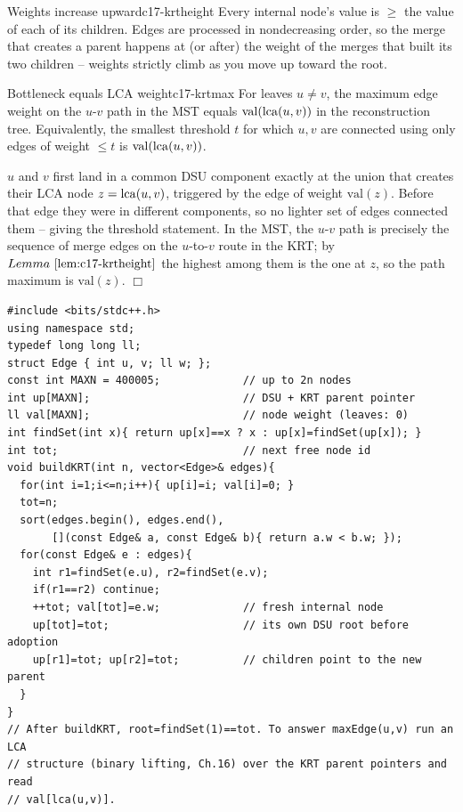 \begin{lemma}{Weights increase upward}{c17-krtheight}
Every internal node's value is \(\ge\) the value of each of its children.  Edges
are processed in nondecreasing order, so the merge that creates a parent happens
at (or after) the weight of the merges that built its two children -- weights
strictly climb as you move up toward the root.
\end{lemma}

\begin{theorem}{Bottleneck equals LCA weight}{c17-krtmax}
For leaves \(u\ne v\), the maximum edge weight on the \(u\)-\(v\) path in the MST
equals \(\mathrm{val}(\operatorname{lca}(u,v))\) in the reconstruction tree.  Equivalently, the
smallest threshold \(t\) for which \(u,v\) are connected using only edges of
weight \(\le t\) is \(\mathrm{val}(\operatorname{lca}(u,v))\).
\end{theorem}

\begin{proofbox}
\(u\) and \(v\) first land in a common DSU component exactly at the union that
creates their LCA node \(z=\operatorname{lca}(u,v)\), triggered by the edge of weight
\(\mathrm{val}(z)\).  Before that edge they were in different components, so no
lighter set of edges connected them -- giving the threshold statement.  In the
MST, the \(u\)-\(v\) path is precisely the sequence of merge edges on the
\(u\)-to-\(v\) route in the KRT; by \(\lemref{c17-krtheight}\) the highest among
them is the one at \(z\), so the path maximum is \(\mathrm{val}(z)\). \(\Box\)
\end{proofbox}

\begin{lstlisting}[caption={Kruskal-reconstruction tree. On every successful union, allocate a new node weighted by the edge and adopt the two component representatives as its children. The up array doubles as the DSU and the KRT parent pointer (find walks it). Queries then reduce to LCA on the KRT (Ch.16)}, label={lst:c17-krt}]
#include <bits/stdc++.h>
using namespace std;
typedef long long ll;
struct Edge { int u, v; ll w; };
const int MAXN = 400005;             // up to 2n nodes
int up[MAXN];                        // DSU + KRT parent pointer
ll val[MAXN];                        // node weight (leaves: 0)
int findSet(int x){ return up[x]==x ? x : up[x]=findSet(up[x]); }
int tot;                             // next free node id
void buildKRT(int n, vector<Edge>& edges){
  for(int i=1;i<=n;i++){ up[i]=i; val[i]=0; }
  tot=n;
  sort(edges.begin(), edges.end(),
       [](const Edge& a, const Edge& b){ return a.w < b.w; });
  for(const Edge& e : edges){
    int r1=findSet(e.u), r2=findSet(e.v);
    if(r1==r2) continue;
    ++tot; val[tot]=e.w;             // fresh internal node
    up[tot]=tot;                     // its own DSU root before adoption
    up[r1]=tot; up[r2]=tot;          // children point to the new parent
  }
}
// After buildKRT, root=findSet(1)==tot. To answer maxEdge(u,v) run an LCA
// structure (binary lifting, Ch.16) over the KRT parent pointers and read
// val[lca(u,v)].
\end{lstlisting}

